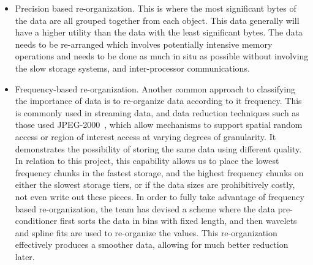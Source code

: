 \begin{itemize} 
	
\item Precision based re-organization. This is where the most significant bytes
	of the data are all grouped together from each object. This data
	generally will have a higher utility than the data with the least
	significant bytes. 
	The data needs to be re-arranged which involves potentially intensive 
        memory operations and needs to be done as much in situ as possible without
        involving the slow storage systems, and inter-processor communications.
%
\item Frequency-based re-organization.  Another common approach to classifying
	the importance of data is to re-organize data according to it frequency.
	This is commonly used in streaming data, and data reduction techniques
        such as those used JPEG-2000~\cite{jpeg2000}, which allow mechanisms
	to support spatial random access or region of interest
	access at varying degrees of granularity. It demonstrates the possibility of storing
	the same data using different quality. In relation to this project, this
        capability allows us to place the lowest frequency chunks in the fastest storage, and the
	highest frequency chunks on either the slowest storage tiers, or if the data
	sizes are prohibitively  costly, not even write out these pieces. 
	 In order to fully take advantage of frequency based
	re-organization, the team has devised a scheme where the data pre-conditioner
	first sorts the data in bins with fixed length, and then wavelets and spline fits are used to
	re-organize the values.  This re-organization effectively produces
	a smoother data, allowing for much better reduction later.
\end{itemize}

